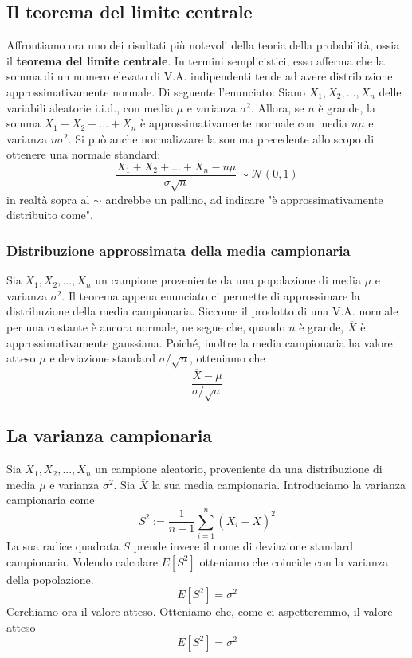 \documentclass[11pt]{article}
\begin{document}
\subsection{Il teorema del limite centrale}
Affrontiamo ora uno dei risultati più notevoli della teoria della probabilità, ossia il \textbf{teorema del limite centrale}. In termini semplicistici, esso afferma che la somma di un numero elevato di V.A. indipendenti tende ad avere distribuzione approssimativamente normale. Di seguente l'enunciato:
Siano $X_1,X_2,...,X_n$ delle variabili aleatorie i.i.d., con media $\mu$ e varianza $\sigma^2$. Allora, se $n$ è grande, la somma $X_1+X_2+...+X_n$ è approssimativamente normale con media $n\mu$ e varianza $n\sigma^2$. Si può anche normalizzare la somma precedente allo scopo di ottenere una normale standard:
\begin{displaymath}
    \frac{X_1+X_2+...+X_n-n\mu}{\sigma\sqrt{n}}\sim \mathcal{N} (0,1)
\end{displaymath}
in realtà sopra al $\sim$ andrebbe un pallino, ad indicare "è approssimativamente distribuito come".
\subsubsection{Distribuzione approssimata della media campionaria}
Sia $X_1,X_2,...,X_n$ un campione proveniente da una popolazione di media $\mu$ e varianza $\sigma^2$. Il teorema appena enunciato ci permette di approssimare la distribuzione della media campionaria. Siccome il prodotto di una V.A. normale per una costante è ancora normale, ne segue che, quando $n$ è grande, $\overline{X}$ è approssimativamente gaussiana. Poiché, inoltre la media campionaria ha valore atteso $\mu$ e deviazione standard $\sigma/\sqrt{n}$, otteniamo che
\begin{displaymath}
    \frac{\overline{X}-\mu}{\sigma/\sqrt{n}}
\end{displaymath}
\subsection{La varianza campionaria}
Sia $X_1,X_2,...,X_n$ un campione aleatorio, proveniente da una distribuzione di media $\mu$ e varianza $\sigma^2$. Sia $\overline{X}$ la sua media campionaria. Introduciamo la varianza campionaria come
\begin{displaymath}
    S^2:=\frac{1}{n-1}\sum_{i=1}^n(X_i-\overline{X})^2
\end{displaymath}
La sua radice quadrata $S$ prende invece il nome di deviazione standard campionaria. Volendo calcolare $E[S^2]$ otteniamo che coincide con la varianza della popolazione.
\begin{displaymath}
    E[S^2]=\sigma^2
\end{displaymath}
Cerchiamo ora il valore atteso. Otteniamo che, come ci aspetteremmo, il valore atteso 
\begin{displaymath}
    E[S^2]=\sigma^2
\end{displaymath}
\end{document}
